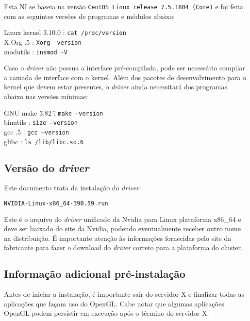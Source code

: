 \documentclass[twoside,a4paper,12pt,english]{inac17}
\begin{document}
Esta NI se baseia na versão \texttt{CentOS Linux release 7.5.1804 (Core)} 
e foi feita com as seguintes versões de programas e módulos abaixo:

\begin{tabbing}
Linux kernel \= 3.10.0 \= : \= \texttt{cat /proc/version} \\
X.Org .5 \> : \> \texttt{Xorg -version} \\
modutils  \> : \> \texttt{insmod -V}
\end{tabbing}

Caso o \textit{driver} não possua a interface pré-compilada, pode ser necessário 
compilar a camada de interface com o kernel. Além dos pacotes de desenvolvimento 
para o kernel que devem estar presentes, o \textit{driver} ainda necessitará dos 
programas abaixo nas versões mínimas:

\begin{tabbing}
GNU make	 \= 3.82	\= : \= \texttt{make --version} \\
binutils	 	\> : \> \texttt{size --version} \\
gcc 		 .5	\> : \> \texttt{gcc --version} \\
glibc	 	\> : \> \texttt{ls /lib/libc.so.6}\\
\end{tabbing}


\subsection{Versão do \textit{driver}}

Este documento trata da instalação do \textit{driver}:

\texttt{NVIDIA-Linux-x86\_64-390.59.run}

Este é o arquivo do \textit{driver} unificado da Nvidia para 
Linux plataforma x86\_64 e deve ser baixado do site da Nvidia, podendo  eventualmente receber outro nome na distribuição. É importante 
atenção às informações fornecidas pelo site da fabricante para 
fazer o download do \textit{driver} correto para a plataforma 
do cluster.

\subsection{Informação adicional pré-instalação}

Antes de iniciar a instalação, é importante sair do servidor X e 
finalizar todas as aplicações que façam uso do OpenGL. Cabe notar 
que algumas aplicações OpenGL podem persistir em execução após 
o término do servidor X.
\end{document}
